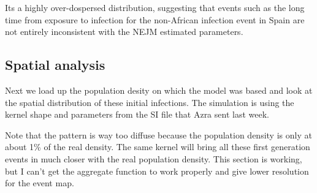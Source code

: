 \documentclass{article}\usepackage{graphicx, color}
\begin{document}
Its a highly over-dospersed distribution, suggesting that events such as the
long time from exposure to infection for the non-African infection event
in Spain are not entirely inconsistent with the NEJM estimated parameters.

\subsection{Spatial analysis}

Next we load up the population desity on which the model was based and look at
the spatial distribution of these initial infections. The simulation is using
the kernel shape and parameters from the SI file that Azra sent last week.

Note that the pattern is way too diffuse because the population
density is only at about 1\% of the real density. The same kernel will bring
all these first generation events in much closer with the real population
density. This section is working, but I can't get the aggregate function to work
properly and give lower resolution for the event map.
\end{document}
